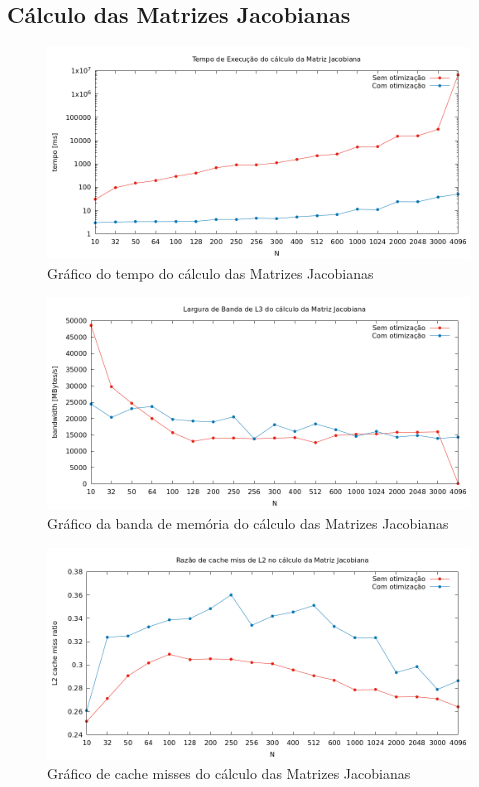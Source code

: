 \documentclass{article}
\begin{document}
\newpage
\subsection{Cálculo das Matrizes Jacobianas}

\begin{figure}[htp]
    \centering
    \includegraphics[width=12cm]{tempo_jacobiana.png}
    \caption{Gráfico do tempo do cálculo das Matrizes Jacobianas}
    \label{fig:tempo_jac}
\end{figure}

\begin{figure}[htp]
    \centering
    \includegraphics[width=12cm]{l3_jacobiana.png}
    \caption{Gráfico da banda de memória do cálculo das Matrizes Jacobianas}
    \label{fig:l3_jac}
\end{figure}

\begin{figure}[htp]
    \centering
    \includegraphics[width=12cm]{l2cache_jacobiana.png}
    \caption{Gráfico de cache misses do cálculo das Matrizes Jacobianas}
    \label{fig:l2_jac}
\end{figure}
\end{document}
